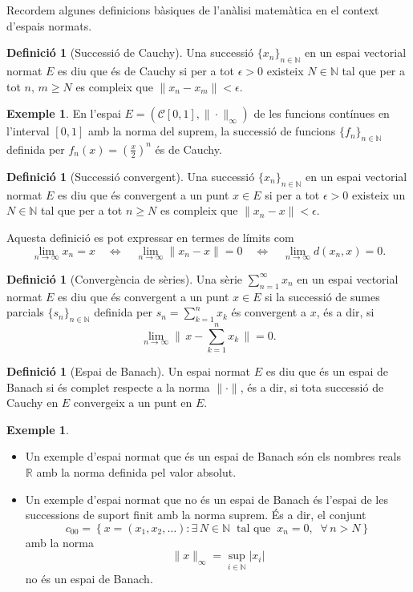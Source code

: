 \documentclass[12pt]{book}
\theoremstyle{definition}
\newtheorem{defi}[teorema]{Definició}
\theoremstyle{nota}
\theoremstyle{exemple}
\newtheorem{exemple}[teorema]{Exemple}
\begin{document}
Recordem algunes definicions bàsiques de l'anàlisi matemàtica en el
context d'espais normats.

\begin{defi}[Successió de Cauchy]
  Una successió $\{x_n\}_{n \in \mathbb{N}}$ en un espai vectorial
  normat $E$ es diu que és de Cauchy si per a tot $\epsilon > 0$
  existeix $N \in \mathbb{N}$ tal que per a tot $n, \, m \geq N$ es
  compleix que $\|x_n - x_m\| < \epsilon$.
\end{defi}

\begin{exemple}
  En l'espai $E = (\mathcal{C}[0,1], \|\cdot\|_\infty)$ de les
  funcions contínues en l'interval $[0,1]$ amb la norma del suprem, la
  successió de funcions $\{f_n\}_{n \in \mathbb{N}}$ definida per
  $f_n(x) = \left( \frac{x}{2} \right)^n$ és de Cauchy.
\end{exemple}

\begin{defi}[Successió convergent]
  Una successió $\{x_n\}_{n \in \mathbb{N}}$ en un espai vectorial
  normat $E$ es diu que és convergent a un punt $x \in E$ si per a tot
  $\epsilon > 0$ existeix un $N \in \mathbb{N}$ tal que per a tot
  $n \geq N$ es compleix que $\|x_n - x\| < \epsilon$.
\end{defi}

Aquesta definició es pot expressar en termes de límits com
\[
  \lim_{n \to \infty} x_n = x \quad \iff \quad
  \lim_{n \to \infty} \|x_n - x\| = 0 \quad \iff \quad
  \lim_{n \to \infty} d(x_n, x) = 0.
\]

\begin{defi}[Convergència de sèries]
  Una sèrie $\sum_{n=1}^{\infty} x_n$ en un espai vectorial normat $E$
  es diu que és convergent a un punt $x \in E$ si la successió de
  sumes parcials $\{s_n\}_{n \in \mathbb{N}}$ definida per
  $s_n = \sum_{k=1}^{n} x_k$ és convergent a $x$, és a dir, si
  \[
    \lim_{n \to \infty} \Big\| \, x - \sum_{k=1}^{n} x_k \, \Big\| = 0.
  \]
\end{defi}

\begin{defi}[Espai de Banach]
  Un espai normat $E$ es diu que és un espai de Banach si és complet
  respecte a la norma $\|\cdot\|$, és a dir, si tota successió de
  Cauchy en $E$ convergeix a un punt en $E$.
\end{defi}

\begin{exemple}
  \begin{itemize}
  \item Un exemple d'espai normat que és un espai de Banach són els
    nombres reals $\mathbb{R}$ amb la norma definida pel valor absolut.
  \item Un exemple d'espai normat que no és un espai de Banach és
    l'espai de les successions de suport finit amb la norma suprem. És
    a dir, el conjunt
    \[
      c_{00} = \left\{ x = (x_1, x_2, \dotsc) : \exists\, N \in \mathbb{N}
        \;\; \text{tal que} \;\; x_n = 0, \;\; \forall\, n > N \right\}
    \]
    amb la norma
    \[
      \|x\|_\infty = \sup_{i \in \mathbb{N}} |x_i|
    \]
    no és un espai de Banach.
  \end{itemize}
\end{exemple}
\end{document}

